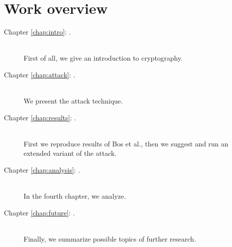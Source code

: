 \section*{Work overview}
	\begin{description}
		\item[Chapter \ref{chap:intro}: .] ~ \\
			First of all, we give an introduction to cryptography.
		\item[Chapter \ref{chap:attack}: .] ~ \\
			We present the attack technique.
		\item[Chapter \ref{chap:results}: .] ~ \\
			First we reproduce results of Bos et al., then we suggest and run an extended variant of the attack.
		\item[Chapter \ref{chap:analysis}: .] ~ \\
			In the fourth chapter, we analyze.
		\item[Chapter \ref{chap:future}: .] ~ \\
			Finally, we summarize possible topics of further research.
	\end{description}

